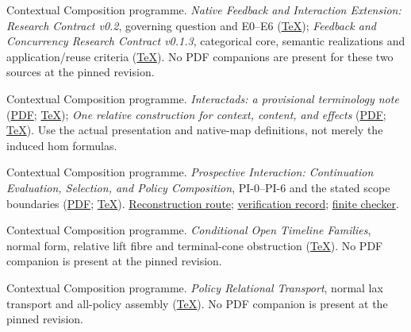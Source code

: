 \documentclass[11pt]{article}
\newcommand{\reposrc}[2]{\href{https://github.com/eternal-november/eos-research-programmes/blob/2de56b5541a5e67d44353e58d138978d31c5901c/projects/contextual-composition/#1}{#2}}
\begin{document}
\clearpage
\begin{thebibliography}{10}
\small

Contextual Composition programme.
\emph{Native Feedback and Interaction Extension: Research Contract v0.2}, governing question and E0--E6
(\reposrc{contracts/Native_Feedback_and_Interaction_Extension_Contract_v0_2.tex}{TeX});
\emph{Feedback and Concurrency Research Contract v0.1.3}, categorical core, semantic realizations and application/reuse criteria
(\reposrc{contracts/Feedback_and_Concurrency_Research_Contract_v0_1_3.tex}{TeX}).
No PDF companions are present for these two sources at the pinned revision.

Contextual Composition programme.
\emph{Interactads: a provisional terminology note}
(\reposrc{foundations/terminology/Interactad_Terminology_Note.pdf}{PDF};
\reposrc{foundations/terminology/Interactad_Terminology_Note.tex}{TeX});
\emph{One relative construction for context, content, and effects}
(\reposrc{foundations/relative-construction/delivery/One_relative_construction_for_context_content_and_effects.pdf}{PDF};
\reposrc{foundations/relative-construction/delivery/One_relative_construction_for_context_content_and_effects.tex}{TeX}).
Use the actual presentation and native-map definitions, not merely the induced hom formulas.

Contextual Composition programme.
\emph{Prospective Interaction: Continuation Evaluation, Selection, and Policy Composition}, PI-0--PI-6 and the stated scope boundaries
(\reposrc{foundations/prospective-interaction/Prospective_Interaction.pdf}{PDF};
\reposrc{foundations/prospective-interaction/Prospective_Interaction.tex}{TeX}).
\reposrc{foundations/prospective-interaction/RECONSTRUCTION.txt}{Reconstruction route};
\reposrc{foundations/prospective-interaction/VERIFICATION.txt}{verification record};
\reposrc{foundations/prospective-interaction/checks/check_finite_prospective.py}{finite checker}.

Contextual Composition programme.
\emph{Conditional Open Timeline Families}, normal form, relative lift fibre and terminal-cone obstruction
(\reposrc{foundations/native-whole-scope-feedback/Conditional_Open_Timeline_Families.tex}{TeX}).
No PDF companion is present at the pinned revision.

Contextual Composition programme.
\emph{Policy Relational Transport}, normal lax transport and all-policy assembly
(\reposrc{foundations/native-whole-scope-feedback/Policy_Relational_Transport.tex}{TeX}).
No PDF companion is present at the pinned revision.


\end{thebibliography}
\end{document}
